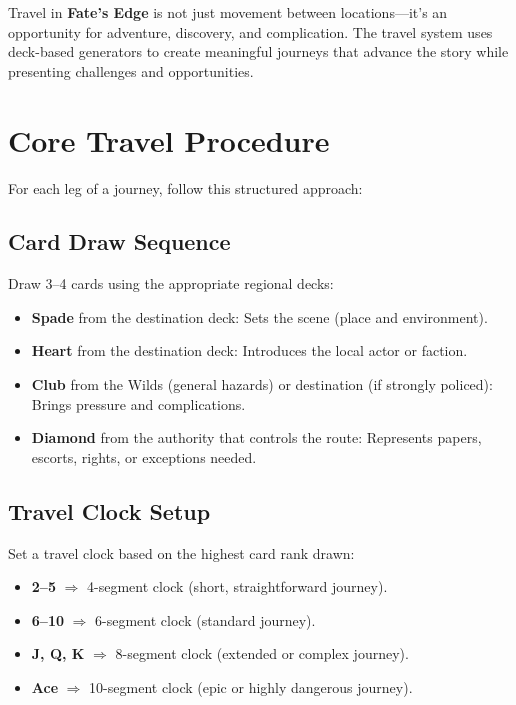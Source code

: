 Travel in \textbf{Fate's Edge} is not just movement between locations—it's an opportunity for adventure, discovery, and complication. The travel system uses deck-based generators to create meaningful journeys that advance the story while presenting challenges and opportunities. 

\section{Core Travel Procedure}
\label{sec:core-travel}

For each leg of a journey, follow this structured approach: 

\subsection{Card Draw Sequence}
\label{subsec:card-draw}

Draw 3–4 cards using the appropriate regional decks:
\begin{itemize}
\item \textbf{Spade} from the destination deck: Sets the scene (place and environment).
\item \textbf{Heart} from the destination deck: Introduces the local actor or faction.
\item \textbf{Club} from the Wilds (general hazards) or destination (if strongly policed): Brings pressure and complications.
\item \textbf{Diamond} from the authority that controls the route: Represents papers, escorts, rights, or exceptions needed.
\end{itemize}

\subsection{Travel Clock Setup}
\label{subsec:travel-clock}

Set a travel clock based on the highest card rank drawn:
\begin{itemize}
\item \textbf{2--5} $\Rightarrow$ 4-segment clock (short, straightforward journey).
\item \textbf{6--10} $\Rightarrow$ 6-segment clock (standard journey).
\item \textbf{J, Q, K} $\Rightarrow$ 8-segment clock (extended or complex journey).
\item \textbf{Ace} $\Rightarrow$ 10-segment clock (epic or highly dangerous journey).
\end{itemize}

